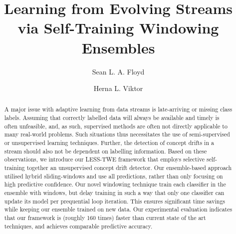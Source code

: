 \documentclass[runningheads]{llncs}
\begin{document}
%
\title{Learning from Evolving Streams via Self-Training Windowing Ensembles}
%
%
\author{Sean L. A. Floyd \and
Herna L. Viktor}
%
%
%
\maketitle              %
%
\begin{abstract}
A major issue with adaptive learning from data streams is late-arriving or missing class labels. Assuming that correctly labelled data will always be available and timely is often unfeasible, and, as such, supervised methods are often not directly applicable to many real-world problems. Such situations thus necessitates the use of semi-supervised or unsupervised learning techniques. Further, the detection of concept drifts in a stream should also not be dependent on labelling information. Based on these observations, we introduce our LESS-TWE framework that employs selective self-training together an unsupervised concept drift detector. Our ensemble-based approach utilised hybrid sliding-windows and use all predictions, rather than only focusing on high predictive confidence.  Our novel windowing technique train each classifier in the ensemble with windows, but delay training in such a way that only one classifier can update its model per prequential loop iteration. This ensures significant time savings while keeping our ensemble trained on new data.
Our experimental evaluation indicates that our framework is (roughly 160 times) faster than current state of the art techniques, and achieves comparable predictive accuracy.

\end{abstract}
%
%
%
\end{document}
